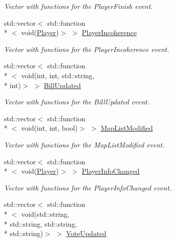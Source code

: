 \begin{DoxyCompactItemize}
\begin{DoxyCompactList}\small\item\em Vector with functions for the Player\-Finish event. \end{DoxyCompactList}\item 
\hypertarget{classPlugin_abcc9fff7f98ac9a872a965f0809b7f53}{std\-::vector$<$ std\-::function\\*
$<$ void(\hyperlink{structPlayer}{Player})$>$ $>$ \hyperlink{classPlugin_abcc9fff7f98ac9a872a965f0809b7f53}{Player\-Incoherence}}\label{classPlugin_abcc9fff7f98ac9a872a965f0809b7f53}

\begin{DoxyCompactList}\small\item\em Vector with functions for the Player\-Incoherence event. \end{DoxyCompactList}\item 
\hypertarget{classPlugin_a44ef1f6774366dd3dcc588d7c7afbc8a}{std\-::vector$<$ std\-::function\\*
$<$ void(int, int, std\-::string, \\*
int)$>$ $>$ \hyperlink{classPlugin_a44ef1f6774366dd3dcc588d7c7afbc8a}{Bill\-Updated}}\label{classPlugin_a44ef1f6774366dd3dcc588d7c7afbc8a}

\begin{DoxyCompactList}\small\item\em Vector with functions for the Bill\-Updated event. \end{DoxyCompactList}\item 
\hypertarget{classPlugin_aed57b8e5c978e9de385e165a1668e63e}{std\-::vector$<$ std\-::function\\*
$<$ void(int, int, bool)$>$ $>$ \hyperlink{classPlugin_aed57b8e5c978e9de385e165a1668e63e}{Map\-List\-Modified}}\label{classPlugin_aed57b8e5c978e9de385e165a1668e63e}

\begin{DoxyCompactList}\small\item\em Vector with functions for the Map\-List\-Modified event. \end{DoxyCompactList}\item 
\hypertarget{classPlugin_a2836f95c56beafd0fa2b62f7693a9f3c}{std\-::vector$<$ std\-::function\\*
$<$ void(\hyperlink{structPlayer}{Player})$>$ $>$ \hyperlink{classPlugin_a2836f95c56beafd0fa2b62f7693a9f3c}{Player\-Info\-Changed}}\label{classPlugin_a2836f95c56beafd0fa2b62f7693a9f3c}

\begin{DoxyCompactList}\small\item\em Vector with functions for the Player\-Info\-Changed event. \end{DoxyCompactList}\item 
\hypertarget{classPlugin_a869a88fc900c8a54c2607774cfa44dbc}{std\-::vector$<$ std\-::function\\*
$<$ void(std\-::string, \\*
std\-::string, std\-::string, \\*
std\-::string)$>$ $>$ \hyperlink{classPlugin_a869a88fc900c8a54c2607774cfa44dbc}{Vote\-Updated}}\label{classPlugin_a869a88fc900c8a54c2607774cfa44dbc}


\end{DoxyCompactItemize}
